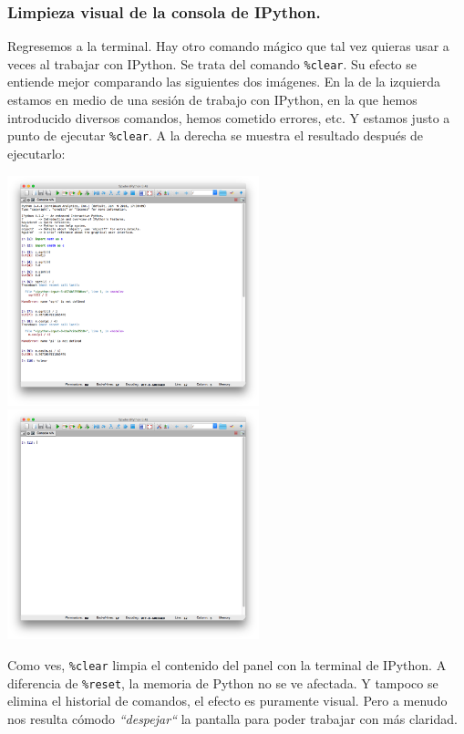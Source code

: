 \documentclass[10pt,a4paper]{article}\usepackage[]{graphicx}\usepackage[]{color}
\newcounter {cont01}
\begin{document}
\subsubsection*{Limpieza visual de la consola de IPython.}
\label{tut02:subsubsec:limpiezaVisualConsolaIPython}

Regresemos a la terminal. Hay otro comando mágico que tal vez quieras usar a veces al trabajar con IPython. Se trata del comando \verb#%clear#.
Su efecto se entiende mejor comparando las siguientes dos imágenes. En la de la izquierda estamos en medio de una sesión de trabajo con IPython, en la que hemos introducido diversos comandos, hemos cometido errores, etc. Y estamos justo a punto de ejecutar  \verb#%clear#.
A la derecha se muestra el resultado después de ejecutarlo:
\begin{center}
\includegraphics[width=7.3cm]{../fig/Tut-02-py-02a.png}\quad
\includegraphics[width=7.3cm]{../fig/Tut-02-py-02b.png}
\end{center}
Como ves,  \verb#%clear#
limpia el contenido del panel con la terminal de IPython. A diferencia de  \verb#%reset#,
la memoria de Python no se ve afectada. Y tampoco se elimina el historial de comandos, el efecto es puramente visual. Pero a menudo nos resulta cómodo {\em ``despejar``} la pantalla para poder trabajar con más claridad.
\end{document}
